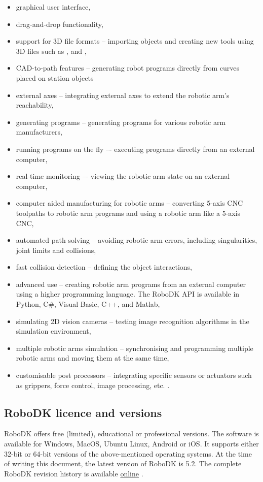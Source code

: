 \begin{itemize}
\item graphical user interface,
\item drag-and-drop functionality, 
\item support for 3D file formats -- importing objects and creating new tools using 3D files such as ,  and ,
\item CAD-to-path features -- generating robot programs directly from curves placed on station objects 
\item external axes -- integrating external axes to extend the robotic arm’s reachability,
\item generating programs -- generating programs for various robotic arm manufacturers,
\item running programs on the fly –- executing programs directly from an external computer,
\item real-time monitoring –- viewing the robotic arm state on an external computer,
\item computer aided manufacturing for robotic arms -- converting 5-axis CNC toolpaths to robotic arm programs and using a robotic arm like a 5-axis CNC,
\item automated path solving -- avoiding robotic arm errors, including singularities, joint limits and collisions,
\item fast collision detection -- defining the object interactions, 
\item advanced use -- creating robotic arm programs from an external computer using a higher programming language. The RoboDK API is available in Python, C\#, Visual Basic, C++, and Matlab,
\item simulating 2D vision cameras -- testing image recognition algorithms in the simulation environment,
\item multiple robotic arms simulation -- synchronising and programming multiple robotic arms and moving them at the same time, 
\item customisable post processors -- integrating specific sensors or actuators such as grippers, force control, image processing, etc. \cite{robodkfeatures}.
\end{itemize}

\subsection{RoboDK licence and versions}

RoboDK offers free (limited), educational or professional versions. 
The software is available for Windows, MacOS, Ubuntu Linux, Android or iOS. It supports either 32-bit or 64-bit versions of the above-mentioned operating systems. At the time of writing this document, the latest version of RoboDK is 5.2. The complete RoboDK revision history is available \href{https://robodk.com/whatsnew}{online} \cite{robodkversions}. 

